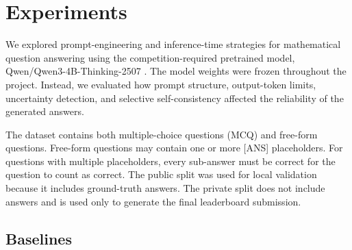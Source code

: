 \documentclass{article}
\begin{document}



\section{Experiments}
\label{sec:experiments}
% 
We explored prompt-engineering and inference-time strategies for mathematical question answering using the competition-required pretrained model, Qwen/Qwen3-4B-Thinking-2507 \cite{qwen3}. The model weights were frozen throughout the project. Instead, we evaluated how prompt structure, output-token limits, uncertainty detection, and selective self-consistency affected the reliability of the generated answers.

The dataset contains both multiple-choice questions (MCQ) and free-form questions. Free-form questions may contain one or more [ANS] placeholders. For questions with multiple placeholders, every sub-answer must be correct for the question to count as correct. The public split was used for local validation because it includes ground-truth answers. The private split does not include answers and is used only to generate the final leaderboard submission.
\subsection{Baselines}
\label{sec:baselines}
\end{document}
